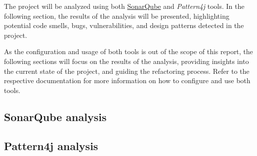 The project will be analyzed using both \href{https://www.sonarsource.com/}{SonarQube} and \textit{Pattern4j} tools. In the following section, the results of the analysis will be presented, highlighting potential code smells, bugs, vulnerabilities, and design patterns detected in the project.

As the configuration and usage of both tools is out of the scope of this report, the following sections will focus on the results of the analysis, providing insights into the current state of the project, and guiding the refactoring process. Refer to the respective documentation for more information on how to configure and use both tools.

\subsection{SonarQube analysis}

\subsection{Pattern4j analysis}
